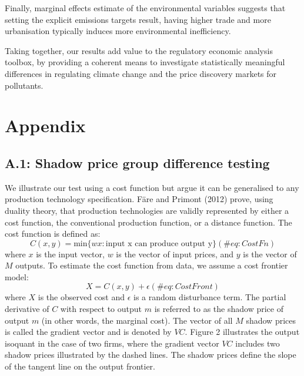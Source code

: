 \documentclass[
  10pt,
]{article}
\begin{document}
Finally, marginal effects estimate of the environmental variables
suggests that setting the explicit emissions targets result, having
higher trade and more urbanisation typically induces more environmental
inefficiency.

Taking together, our results add value to the regulatory economic
analysis toolbox, by providing a coherent means to investigate
statistically meaningful differences in regulating climate change and
the price discovery markets for pollutants.

\newpage

\hypertarget{appendix}{%
\section{Appendix}\label{appendix}}

\hypertarget{a.1-shadow-price-group-difference-testing}{%
\subsection{A.1: Shadow price group difference
testing}\label{a.1-shadow-price-group-difference-testing}}

We illustrate our test using a cost function but argue it can be
generalised to any production technology specification. Färe and Primont
(2012) prove, using duality theory, that production technologies are
validly represented by either a cost function, the conventional
production function, or a distance function. The cost function is
defined as: \begin{equation}
C(x,y)=\text{min} \{wx:\text{input x can produce output y}\}
(\#eq:CostFn)
\end{equation} where \(x\) is the input vector, \(w\) is the vector of
input prices, and \(y\) is the vector of \(M\) outputs. To estimate the
cost function from data, we assume a cost frontier model:
\begin{equation}
X=C(x,y) + \epsilon
(\#eq:CostFront)
\end{equation} where \(X\) is the observed cost and \(\epsilon\) is a
random disturbance term. The partial derivative of \(C\) with respect to
output \(m\) is referred to as the shadow price of output \(m\) (in
other words, the marginal cost). The vector of all \(M\) shadow prices
is called the gradient vector and is denoted by \(VC\). Figure 2
illustrates the output isoquant in the case of two firms, where the
gradient vector \(VC\) includes two shadow prices illustrated by the
dashed lines. The shadow prices define the slope of the tangent line on
the output frontier.
\end{document}
